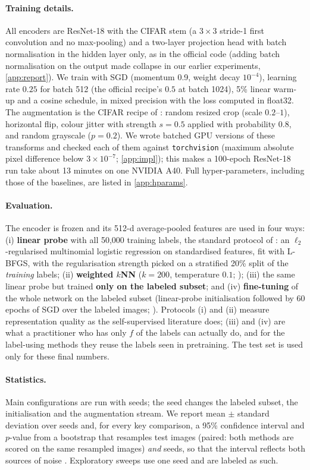 \paragraph{Training details.}
All encoders are ResNet-18 \citep{he2016resnet} with the CIFAR stem (a $3{\times}3$ stride-1 first
convolution and no max-pooling) and a two-layer projection head with batch normalisation in the hidden
layer only, as in the official \supcon code (adding batch normalisation on the output made \supcon
collapse in our earlier experiments, \cref{app:report}). We train with SGD (momentum 0.9, weight decay
$10^{-4}$), learning rate $0.25$ for batch 512 (the official recipe's $0.5$ at batch 1024), 5\% linear
warm-up and a cosine schedule, in mixed precision with the loss computed in float32. The augmentation is
the CIFAR recipe of \citet{chen2020simclr}: random resized crop (scale $0.2$--$1$), horizontal flip, colour
jitter with strength $s=0.5$ applied with probability $0.8$, and random grayscale ($p=0.2$). We wrote
batched GPU versions of these transforms and checked each of them against \texttt{torchvision} (maximum
absolute pixel difference below $3\times10^{-7}$; \cref{app:impl}); this makes a 100-epoch ResNet-18 run take
about 13 minutes on one NVIDIA A40. Full hyper-parameters, including those of the baselines, are listed in
\cref{app:hparams}.

\paragraph{Evaluation.}
The encoder is frozen and its 512-d average-pooled features are used in four ways:
(i) \textbf{linear probe} with all 50,000 training labels, the standard protocol of
\citet{chen2020simclr}: an $\ell_2$-regularised multinomial logistic regression on standardised features,
fit with L-BFGS, with the regularisation strength picked on a stratified 20\% split of the
\emph{training} labels; (ii) \textbf{weighted $k$NN} ($k=200$, temperature $0.1$; \citealp{wu2018instance});
(iii) the same linear probe but trained \textbf{only on the labeled subset}; and (iv) \textbf{fine-tuning} of the
whole network on the labeled subset (linear-probe initialisation followed by 60 epochs of SGD over the labeled
images; \citealp{kumar2022lpft}). Protocols (i) and (ii) measure representation quality as the
self-supervised literature does; (iii) and (iv) are what a practitioner who has only $f$ of the labels can
actually do, and for the label-using methods they reuse the labels seen in pretraining. The test set is used
only for these final numbers.

\paragraph{Statistics.}
Main configurations are run with \nSeeds seeds; the seed changes the labeled subset, the initialisation
and the augmentation stream. We report mean $\pm$ standard deviation over seeds and, for every key
comparison, a 95\% confidence interval and $p$-value from a bootstrap that resamples test images
(paired: both methods are scored on the same resampled images) \emph{and} seeds, so that the interval
reflects both sources of noise \citep{efron1993bootstrap}. Exploratory sweeps use one seed and are
labeled as such.
